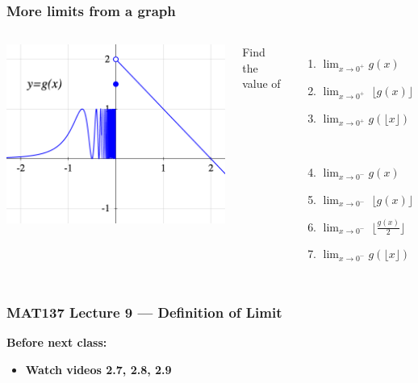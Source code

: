 \documentclass[14pt]{beamer}
\newcommand {\DS} [1] {${\displaystyle #1}$}
\newcommand{\floor}[1]{\lfloor #1 \rfloor}
\begin{document}
\begin{frame}
\frametitle{More limits from a graph}

\begin{columns}[c]


\includegraphics[scale=.4]{G2}

Find the value of 
\begin{enumerate}
			\item  \DS{\lim_{x \to 0^+} g(x)}
			\item \DS{\lim_{x \to 0^+} \; \floor{g(x)}}
			\item  \DS{\lim_{x \to 0^+} g(\floor{x})}
			
			\

			\item  \DS{\lim_{x \to 0^-} g(x)}
			\item \DS{\lim_{x \to 0^-} \; \floor{g(x)}}
			\item \DS{\lim_{x \to 0^-} \; \floor{\frac{g(x)}{2}}}
			\item  \DS{\lim_{x \to 0^-} g(\floor{x})}
\end{enumerate}
\end{columns}

\end{frame}

\begin{frame}
\frametitle{MAT137 Lecture 9 --- Definition of Limit}
	\vfill
	{\bf Before next class:}
		\begin{itemize} \normalsize
			\item {\bf Watch videos 2.7, 2.8, 2.9 }
		\end{itemize}
	\vfill

\end{frame}
\end{document}
